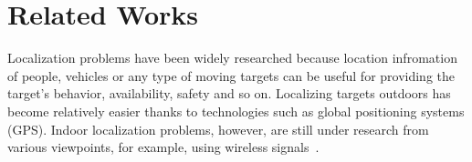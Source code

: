\section{Related Works}
\label{sec:related-works}


Localization problems have been widely researched because location infromation of people, vehicles or any type of moving targets can be useful for providing the target's behavior, availability, safety and so on. Localizing targets outdoors has become relatively easier thanks to technologies such as global positioning systems (GPS). Indoor localization problems, however, are still under research from various viewpoints, for example, using wireless signals~\cite{liu2007}.



